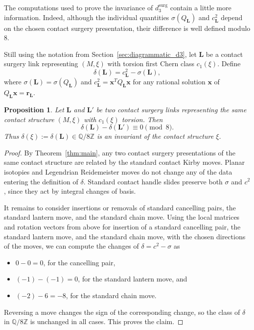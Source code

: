\documentclass{amsart}
\numberwithin{equation}{section}
\numberwithin{figure}{section}
\newtheorem{proposition}[theorem]{Proposition}
\theoremstyle{definition}
\theoremstyle{remark}
\let\olddxi\xi %
\renewcommand{\xi}{\olddxi}
\begin{document}
The computations used to prove the invariance of \(d_3^{\mathrm{surg}}\) contain a little more information. Indeed, although the individual quantities \(\sigma(Q_{\boldsymbol L})\) and \(c_{\boldsymbol L}^2\) depend on the chosen contact surgery presentation, their difference is well defined modulo \(8\).

Still using the notation from Section~\ref{sec:diagrammatic_d3}, let \(\boldsymbol L\) be a contact surgery link representing \((M,\xi)\) with torsion first Chern class \(c_1(\xi)\). Define
\[
\delta(\boldsymbol L)=c_{\boldsymbol L}^2-\sigma(\boldsymbol L),
\]
where \(\sigma(\boldsymbol L)=\sigma(Q_{\boldsymbol L})\) and \(c_{\boldsymbol L}^2=\boldsymbol x^TQ_{\boldsymbol L}\boldsymbol x\) for any rational solution \(\boldsymbol x\) of \(Q_{\boldsymbol L}\boldsymbol x=\boldsymbol r_{\boldsymbol L}\).

\begin{proposition}\label{prop:delta_mod8}
Let \(\boldsymbol L\) and \(\boldsymbol L'\) be two contact surgery links representing the same contact structure \((M,\xi)\) with \(c_1(\xi)\) torsion. Then
\[
\delta(\boldsymbol L)-\delta(\boldsymbol L')\equiv 0 \pmod 8.
\]
Thus \(\delta(\xi):=\delta(\boldsymbol L)\in \mathbb Q/8\mathbb Z\) is an invariant of the contact structure \(\xi\).
\end{proposition}

\begin{proof}
By Theorem~\ref{thm:main}, any two contact surgery presentations of the same contact structure are related by the standard contact Kirby moves. Planar isotopies and Legendrian Reidemeister moves do not change any of the data entering the definition of \(\delta\). Standard contact handle slides preserve both \(\sigma\) and \(c^2\), since they act by integral changes of basis.

It remains to consider insertions or removals of standard cancelling pairs, the standard lantern move, and the standard chain move. Using the local matrices and rotation vectors from above for insertion of a standard cancelling pair, the standard lantern move, and the standard chain move, with the chosen
directions of the moves, we can compute the changes of \(\delta=c^2-\sigma\) as 
\begin{itemize}
    \item $0-0=0$, for the cancelling pair,
    \item $(-1)-(-1)=0$, for the standard lantern move, and
    \item $(-2)-6=-8$, for the standard chain move.   
\end{itemize}
Reversing a move changes the sign of the corresponding change, so the class of \(\delta\) in \(\mathbb Q/8\mathbb Z\) is unchanged in all cases. This proves the claim.
\end{proof}
\end{document}
